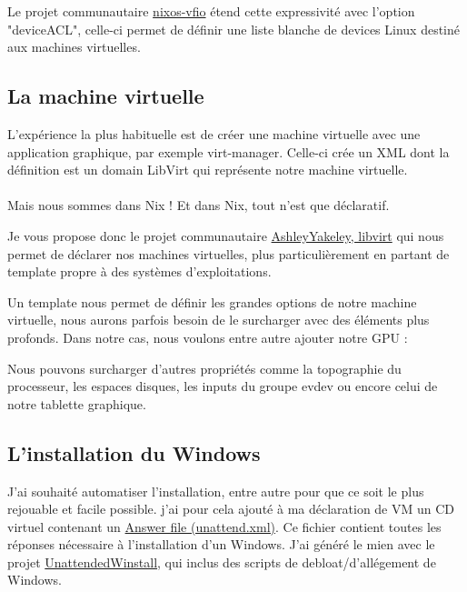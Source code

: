 \documentclass[a4paper,11pt]{article}
\begin{document}
\begin{blogmain}
Le projet communautaire \href{https://github.com/j-brn/nixos-vfio}{nixos-vfio} étend cette expressivité avec l'option "deviceACL", celle-ci permet de définir une liste blanche de devices Linux destiné aux machines virtuelles.

\newpage
\subsection{La machine virtuelle}
L'expérience la plus habituelle est de créer une machine virtuelle avec une application graphique, par exemple virt-manager. Celle-ci crée un XML dont la définition est un domain LibVirt qui représente notre machine virtuelle. \\
\\
Mais nous sommes dans Nix ! Et dans Nix, tout n'est que déclaratif.

Je vous propose donc le projet communautaire \href{https://github.com/AshleyYakeley/NixVirt}{AshleyYakeley, libvirt} qui nous permet de déclarer nos machines virtuelles, plus particulièrement en partant de template propre à des systèmes d'exploitations.


\newpage
Un template nous permet de définir les grandes options de notre machine virtuelle, nous aurons parfois besoin de le surcharger avec des éléments plus profonds.
Dans notre cas, nous voulons entre autre ajouter notre GPU :


Nous pouvons surcharger d'autres propriétés comme la topographie du processeur, les espaces disques, les inputs du groupe evdev ou encore celui de notre tablette graphique.

\subsection{L'installation du Windows}
J'ai souhaité automatiser l'installation, entre autre pour que ce soit le plus rejouable et facile possible.
j'ai pour cela ajouté à ma déclaration de VM un CD virtuel contenant un \href{https://learn.microsoft.com/en-us/windows-hardware/manufacture/desktop/update-windows-settings-and-scripts-create-your-own-answer-file-sxs?view=windows-11}{Answer file (unattend.xml)}.
Ce fichier contient toutes les réponses nécessaire à l'installation d'un Windows.
J'ai généré le mien avec le projet \href{https://github.com/memstechtips/UnattendedWinstall}{UnattendedWinstall}, qui inclus des scripts de debloat/d'allégement de Windows.


\end{blogmain}
\end{document}
